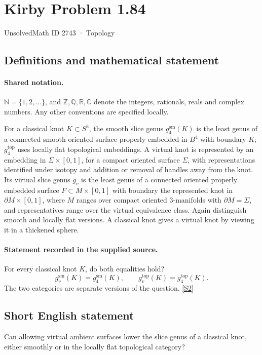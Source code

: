 \documentclass[11pt]{article}
\newcommand{\sref}[2]{\hyperlink{source:#1:#2}{[S#2]}}
\begin{document}
\setcounter{section}{2742}
\section{Kirby Problem 1.84}\label{2743}
{\small\sffamily UnsolvedMath ID 2743 · Topology}
\subsection{Definitions and mathematical statement}

\paragraph{Shared notation.}$\mathbb N=\{1,2,\ldots\}$, and $\mathbb Z,\mathbb Q,\mathbb R,\mathbb C$ denote the integers, rationals, reals and complex numbers. Any other conventions are specified locally.


For a classical knot $K\subset S^3$, the smooth slice genus $g_4^{\mathrm{sm}}(K)$ is the least genus of a connected smooth oriented surface properly embedded in $B^4$ with boundary $K$; $g_4^{\mathrm{top}}$ uses locally flat topological embeddings. A virtual knot is represented by an embedding in $\Sigma\times[0,1]$, for a compact oriented surface $\Sigma$, with representations identified under isotopy and addition or removal of handles away from the knot. Its virtual slice genus $g_v$ is the least genus of a connected oriented properly embedded surface $F\subset M\times[0,1]$ with boundary the represented knot in $\partial M\times[0,1]$, where $M$ ranges over compact oriented 3-manifolds with $\partial M=\Sigma$, and representatives range over the virtual equivalence class. Again distinguish smooth and locally flat versions. A classical knot gives a virtual knot by viewing it in a thickened sphere.
\paragraph{Statement recorded in the supplied source.}
For every classical knot $K$, do both equalities hold?
\[g_v^{\mathrm{sm}}(K)=g_4^{\mathrm{sm}}(K),\qquad g_v^{\mathrm{top}}(K)=g_4^{\mathrm{top}}(K).\]
The two categories are separate versions of the question. \sref{2743}{2}

\subsection{Short English statement}
Can allowing virtual ambient surfaces lower the slice genus of a classical knot, either smoothly or in the locally flat topological category?
\end{document}
